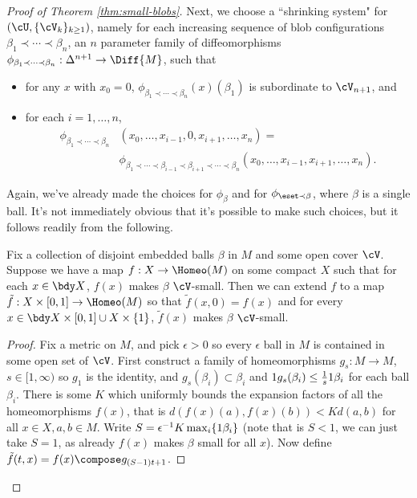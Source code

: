 \begin{proof}[Proof of Theorem \ref{thm:small-blobs}]
Next, we choose a ``shrinking system" for $\left(\cU,\{\cV_k\}_{k \geq 1}\right)$, namely for each increasing sequence of blob configurations
$\beta_1 \prec \cdots \prec \beta_n$, an $n$ parameter family of diffeomorphisms
$\phi_{\beta_1 \prec \cdots \prec \beta_n} : \Delta^{n+1} \to \Diff{M}$, such that
\begin{itemize}
\item for any $x$ with $x_0 = 0$, $\phi_{\beta_1 \prec \cdots \prec \beta_n}(x)(\beta_1)$ is subordinate to $\cV_{n+1}$, and
\item for each $i = 1, \ldots, n$,
\begin{align*}
\phi_{\beta_1 \prec \cdots \prec \beta_n}&(x_0, \ldots, x_{i-1},0,x_{i+1},\ldots,x_n) = \\ &\phi_{\beta_1 \prec \cdots \prec \beta_{i-1} \prec \beta_{i+1} \prec \cdots \prec \beta_n}(x_0,\ldots, x_{i-1},x_{i+1},\ldots,x_n).
\end{align*}
\end{itemize}
Again, we've already made the choices for $\phi_{\beta}$ and for $\phi_{\eset \prec \beta}$, where $\beta$ is a single ball. It's not immediately obvious that it's possible to make such choices, but it follows readily from the following.

\begin{lem}
\label{lem:extend-small-homeomorphisms}
Fix a collection of disjoint embedded balls $\beta$ in $M$ and some open cover $\cV$. Suppose we have a map $f :  X \to \Homeo(M)$ on some compact $X$ such that for each $x \in \bdy X$, $f(x)$ makes $\beta$ $\cV$-small. Then we can extend $f$ to a map $\tilde{f} : X \times [0,1] \to \Homeo(M)$ so that $\tilde{f}(x,0) = f(x)$ and for every $x \in \bdy X \times [0,1] \cup X \times \{1\}$, $\tilde{f}(x)$ makes $\beta$ $\cV$-small.
\end{lem}
\begin{proof}
Fix a metric on $M$, and pick $\epsilon > 0$ so every $\epsilon$ ball in $M$ is contained in some open set of $\cV$. First construct a family of homeomorphisms $g_s : M \to M$, $s \in [1,\infty)$ so $g_1$ is the identity, and $g_s(\beta_i) \subset \beta_i$ and $1 g_s(\beta_i) \leq \frac{1}{s} 1 \beta_i$ for each ball $\beta_i$. 
There is some $K$ which uniformly bounds the expansion factors of all the homeomorphisms $f(x)$, that is $d(f(x)(a), f(x)(b)) < K d(a,b)$ for all $x \in X, a,b \in M$. Write $S=\epsilon^{-1} K \max_i \{1 \beta_i\}$ (note that is $S<1$, we can just take $S=1$, as already $f(x)$ makes $\beta$ small for all $x$). Now define $\tilde{f}(t, x) = f(x) \compose g_{(S-1)t+1}$.


\end{proof}
\end{proof}
